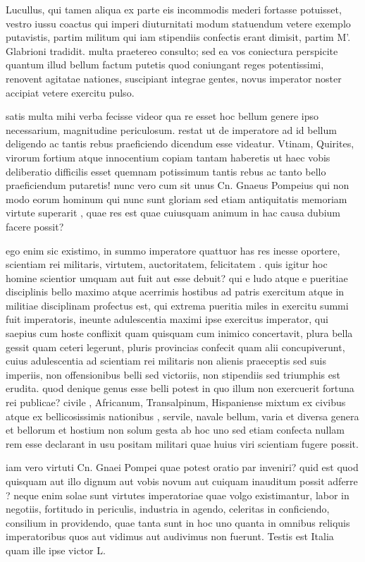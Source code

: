  Lucullus, qui tamen aliqua ex parte eis incommodis mederi fortasse potuisset, vestro iussu coactus qui imperi diuturnitati modum statuendum vetere exemplo putavistis, partim militum qui iam stipendiis confectis erant dimisit, partim M'. Glabrioni tradidit. multa praetereo consulto; sed ea vos coniectura perspicite quantum illud bellum factum putetis quod coniungant reges potentissimi, renovent agitatae nationes, suscipiant integrae gentes, novus imperator noster accipiat vetere exercitu pulso.

 satis multa mihi verba fecisse videor qua re esset hoc bellum genere ipso necessarium, magnitudine periculosum. restat ut de imperatore ad id bellum deligendo ac tantis rebus praeficiendo dicendum esse videatur. Vtinam, Quirites, virorum fortium atque innocentium copiam tantam haberetis ut haec vobis deliberatio difficilis esset quemnam potissimum tantis rebus ac tanto bello praeficiendum putaretis! nunc vero cum sit unus Cn. Gnaeus Pompeius qui non modo eorum hominum qui nunc sunt gloriam sed etiam antiquitatis memoriam virtute superarit , quae res est quae cuiusquam animum in hac causa dubium facere possit?

 ego enim sic existimo, in summo imperatore quattuor has res inesse oportere, scientiam rei militaris, virtutem, auctoritatem, felicitatem . quis igitur hoc homine scientior umquam aut fuit aut esse debuit? qui e ludo atque e pueritiae disciplinis bello maximo atque acerrimis hostibus ad patris exercitum atque in militiae disciplinam profectus est, qui extrema pueritia miles in exercitu summi fuit imperatoris, ineunte adulescentia maximi ipse exercitus imperator, qui saepius cum hoste conflixit quam quisquam cum inimico concertavit, plura bella gessit quam ceteri legerunt, pluris provincias confecit quam alii concupiverunt, cuius adulescentia ad scientiam rei militaris non alienis praeceptis sed suis imperiis, non offensionibus belli sed victoriis, non stipendiis sed triumphis est erudita. quod denique genus esse belli potest in quo illum non exercuerit fortuna rei publicae? civile , Africanum, Transalpinum, Hispaniense mixtum ex civibus atque ex bellicosissimis nationibus , servile, navale bellum, varia et diversa genera et bellorum et hostium non solum gesta ab hoc uno sed etiam confecta nullam rem esse declarant in usu positam militari quae huius viri scientiam fugere possit.

 iam vero virtuti Cn. Gnaei Pompei quae potest oratio par inveniri? quid est quod quisquam aut illo dignum aut vobis novum aut cuiquam inauditum possit adferre ? neque enim solae sunt virtutes imperatoriae quae volgo existimantur, labor in negotiis, fortitudo in periculis, industria in agendo, celeritas in conficiendo, consilium in providendo, quae tanta sunt in hoc uno quanta in omnibus reliquis imperatoribus quos aut vidimus aut audivimus non fuerunt. Testis est Italia quam ille ipse victor L.

